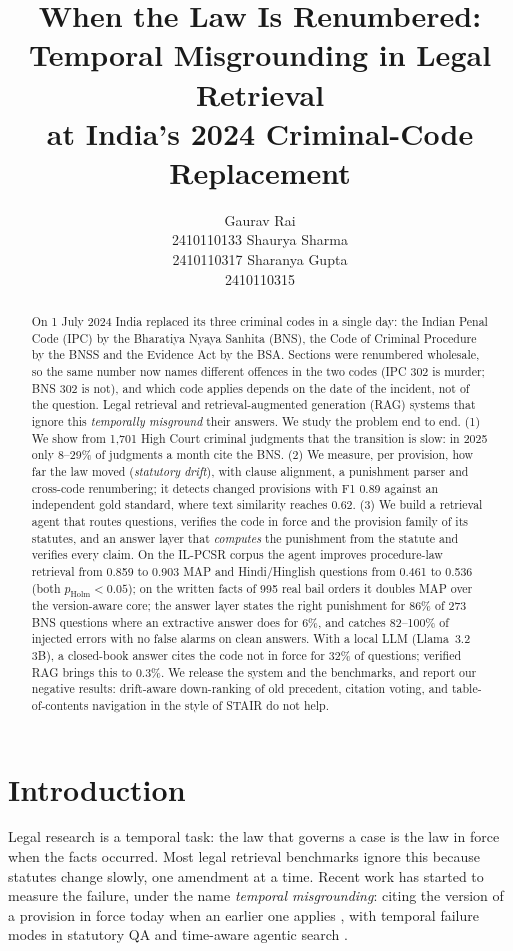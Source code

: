 \documentclass[11pt]{article}
\title{When the Law Is Renumbered: Temporal Misgrounding in Legal Retrieval\\
at India's 2024 Criminal-Code Replacement}
\author{Gaurav Rai \\ 2410110133 \And Shaurya Sharma \\ 2410110317 \And Sharanya Gupta \\ 2410110315}
\begin{document}
\maketitle

\begin{abstract}
On 1 July 2024 India replaced its three criminal codes in a single day: the Indian Penal Code
(IPC) by the Bharatiya Nyaya Sanhita (BNS), the Code of Criminal Procedure by the BNSS and the
Evidence Act by the BSA. Sections were renumbered wholesale, so the same number now names
different offences in the two codes (IPC 302 is murder; BNS 302 is not), and which code applies
depends on the date of the incident, not of the question. Legal retrieval and retrieval-augmented
generation (RAG) systems that ignore this \emph{temporally misground} their answers. We study the
problem end to end. (1) We show from 1,701 High Court criminal judgments that the transition is
slow: in 2025 only 8--29\% of judgments a month cite the BNS. (2) We measure, per provision, how
far the law moved (\emph{statutory drift}), with clause alignment, a punishment parser and
cross-code renumbering; it detects changed provisions with F1 0.89 against an independent gold
standard, where text similarity reaches 0.62. (3) We build a retrieval agent that routes questions,
verifies the code in force and the provision family of its statutes, and an answer layer that
\emph{computes} the punishment from the statute and verifies every claim. On the IL-PCSR corpus
the agent improves procedure-law retrieval from 0.859 to 0.903 MAP and Hindi/Hinglish questions
from 0.461 to 0.536 (both $p_{\text{Holm}}<0.05$); on the written facts of 995 real bail orders it
doubles MAP over the version-aware core; the answer layer states the right punishment for 86\% of
273 BNS questions where an extractive answer does for 6\%, and catches 82--100\% of injected
errors with no false alarms on clean answers. With a local LLM (Llama~3.2 3B), a closed-book answer cites the code not in force for 32\% of
questions; verified RAG brings this to 0.3\%. We release the system and the benchmarks, and
report our negative results: drift-aware down-ranking of old precedent, citation voting, and
table-of-contents navigation in the style of STAIR do not help.
\end{abstract}

\section{Introduction}
Legal research is a temporal task: the law that governs a case is the law in force when the facts
occurred. Most legal retrieval benchmarks ignore this because statutes change slowly, one
amendment at a time. Recent work has started to measure the failure, under the name
\emph{temporal misgrounding}: citing the version of a provision in force today when an earlier one
applies \citep{fiscalqa}, with temporal failure modes in statutory QA \citep{oldfriend} and
time-aware agentic search \citep{timetravel}.
\end{document}
